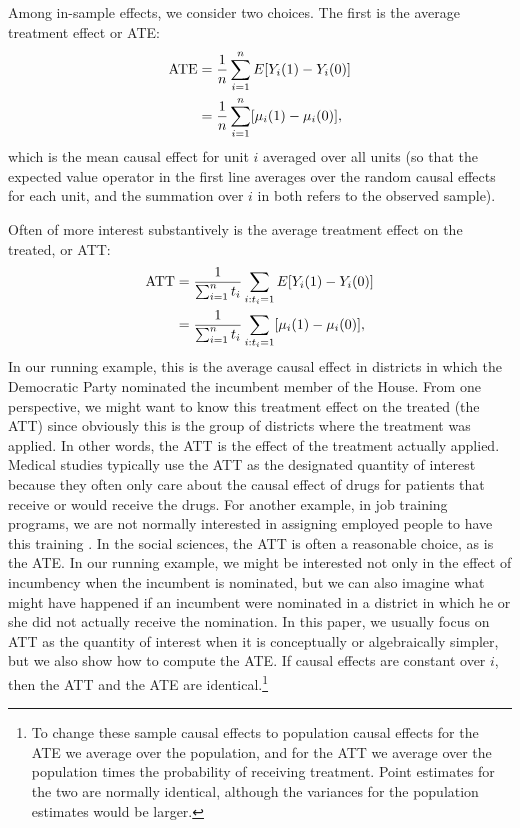 \documentclass[11pt,titlepage]{article}
\begin{document}
Among in-sample effects, we consider two choices.  The first is the
average treatment effect or ATE:
\begin{align}
  \label{pate}
  \text{ATE} & = \frac{1}{n}\sum_{i=1}^n E[Y_i(1) - Y_i(0)] \notag\\
  &  = \frac{1}{n}\sum_{i=1}^n[\mu_i(1) - \mu_i(0)],
\end{align}
which is the mean causal effect for unit $i$ averaged over all units
(so that the expected value operator in the first line averages over
the random causal effects for each unit, and the summation over $i$ in
both refers to the observed sample).

Often of more interest substantively is the average treatment effect
on the treated, or ATT:
\begin{align}
  \label{att}
  \text{ATT} & = \frac{1}{\sum_{i=1}^n t_i}\sum_{i:t_i=1} E[Y_i(1) -
  Y_i(0)]\notag\\ 
  & = \frac{1}{\sum_{i=1}^n t_i}\sum_{i:t_i=1}[\mu_i(1) - \mu_i(0)],
\end{align}
In our running example, this is the average causal effect in districts
in which the Democratic Party nominated the incumbent member of the
House.  From one perspective, we might want to know this treatment
effect on the treated (the ATT) since obviously this is the group of
districts where the treatment was applied.  In other words, the ATT is
the effect of the treatment actually applied.  Medical studies
typically use the ATT as the designated quantity of interest because
they often only care about the causal effect of drugs for patients
that receive or would receive the drugs.  For another example, in job
training programs, we are not normally interested in assigning
employed people to have this training \citep{HecIchTod98}.  In the
social sciences, the ATT is often a reasonable choice, as is the ATE.
In our running example, we might be interested not only in the effect
of incumbency when the incumbent is nominated, but we can also imagine
what might have happened if an incumbent were nominated in a district
in which he or she did not actually receive the nomination.  In this
paper, we usually focus on ATT as the quantity of interest when it is
conceptually or algebraically simpler, but we also show how to compute
the ATE.  If causal effects are constant over $i$, then the ATT and
the ATE are identical.\footnote{To change these sample causal effects
  to population causal effects for the ATE we average over the
  population, and for the ATT we average over the population times the
  probability of receiving treatment.  Point estimates for the two are
  normally identical, although the variances for the population
  estimates would be larger.}
\end{document}
